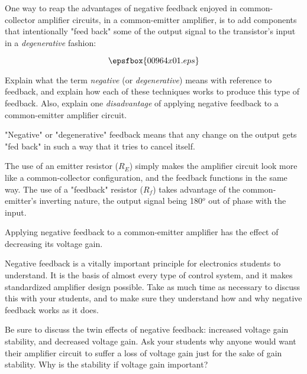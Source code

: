 

One way to reap the advantages of negative feedback enjoyed in common-collector amplifier circuits, in a common-emitter amplifier, is to add components that intentionally "feed back" some of the output signal to the transistor's input in a {\it degenerative} fashion:

$$\epsfbox{00964x01.eps}$$

Explain what the term {\it negative} (or {\it degenerative}) means with reference to feedback, and explain how each of these techniques works to produce this type of feedback.  Also, explain one {\it disadvantage} of applying negative feedback to a common-emitter amplifier circuit.







"Negative" or "degenerative" feedback means that any change on the output gets "fed back" in such a way that it tries to cancel itself.

The use of an emitter resistor ($R_E$) simply makes the amplifier circuit look more like a common-collector configuration, and the feedback functions in the same way.  The use of a "feedback" resistor ($R_f$) takes advantage of the common-emitter's inverting nature, the output signal being 180$^{o}$ out of phase with the input.

Applying negative feedback to a common-emitter amplifier has the effect of decreasing its voltage gain.







Negative feedback is a vitally important principle for electronics students to understand.  It is the basis of almost every type of control system, and it makes standardized amplifier design possible.  Take as much time as necessary to discuss this with your students, and to make sure they understand how and why negative feedback works as it does.

Be sure to discuss the twin effects of negative feedback: increased voltage gain stability, and decreased voltage gain.  Ask your students why anyone would want their amplifier circuit to suffer a loss of voltage gain just for the sake of gain stability.  Why is the stability if voltage gain important?




